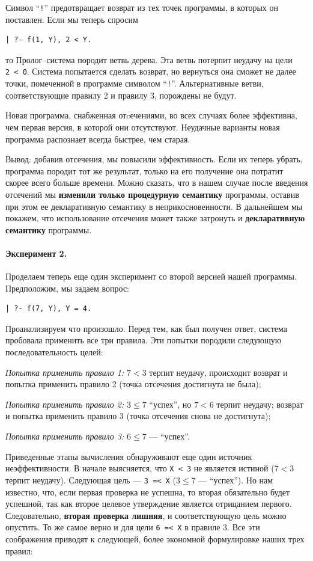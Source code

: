 \documentclass[12pt, openany, twoside]{book} %
\begin{document}
Символ ``{\tt !}'' предотвращает возврат из тех точек программы, в которых он поставлен. Если мы теперь спросим
{\tt \begin{verbatim}
| ?- f(1, Y), 2 < Y.
\end{verbatim}}
\noindent то Пролог--система породит ветвь дерева. Эта ветвь потерпит неудачу на цели {\tt 2~<~0}. Система попытается сделать возврат, но вернуться она сможет не далее точки, помеченной в программе символом ``{\tt !}''. Альтернативные ветви, соответствующие правилу 2 и правилу 3, порождены не будут.

Новая программа, снабженная отcечениями, во всех случаях более эффективна, чем первая версия, в которой они отсутствуют. Неудачные варианты новая программа распознает всегда быстрее, чем старая.

Вывод: добавив отсечения, мы повысили эффективность. Если их теперь убрать, программа породит тот же результат, только на его получение она потратит скорее всего больше времени. Можно сказать, что в нашем случае после введения отсечений мы {\bf изменили только процедурную семантику} программы, оставив при этом ее декларативную семантику в неприкосновенности. В дальнейшем мы покажем, что использование отсечения может также затронуть и {\bf декларативную семантику} программы.

\paragraph{Эксперимент 2.} Проделаем теперь еще один эксперимент со второй версией нашей программы. Предположим, мы задаем вопрос:
{\tt \begin{verbatim}
| ?- f(7, Y), Y = 4.
\end{verbatim}}
\noindent Проанализируем что произошло. Перед тем, как был получен ответ, система пробовала применить все три правила. Эти попытки породили следующую последовательность целей:

\emph{Попытка применить правило 1:}
$7 < 3$ терпит неудачу, происходит возврат и попытка применить правило 2 (точка отсечения достигнута не была);

\emph{Попытка применить правило 2:} $3\leq 7$ ``успех'', но $7 < 6$ терпит неудачу; возврат и попытка применить правило 3 (точка отсечения снова не достигнута);

\emph{Попытка применить правило 3:} {$6\leq 7$} --- ``успех''.

Приведенные этапы вычисления обнаруживают еще один источник неэффективности. В начале выясняется, что {\tt X < 3} не является истиной ($7 < 3$ терпит неудачу). Следующая цель --- {\tt 3~=<~X} ($3 \leq 7$ ---  ``успех''). Но нам известно, что, если первая проверка не успешна, то вторая обязательно будет успешной, так как второе целевое утверждение является отрицанием первого. Следовательно, {\bf вторая проверка лишняя}, и соответствующую цель можно опустить. То же самое верно и для цели {\tt 6~=<~X} в правиле 3. Все эти соображения приводят к следующей, более экономной формулировке наших трех правил:
\end{document}
